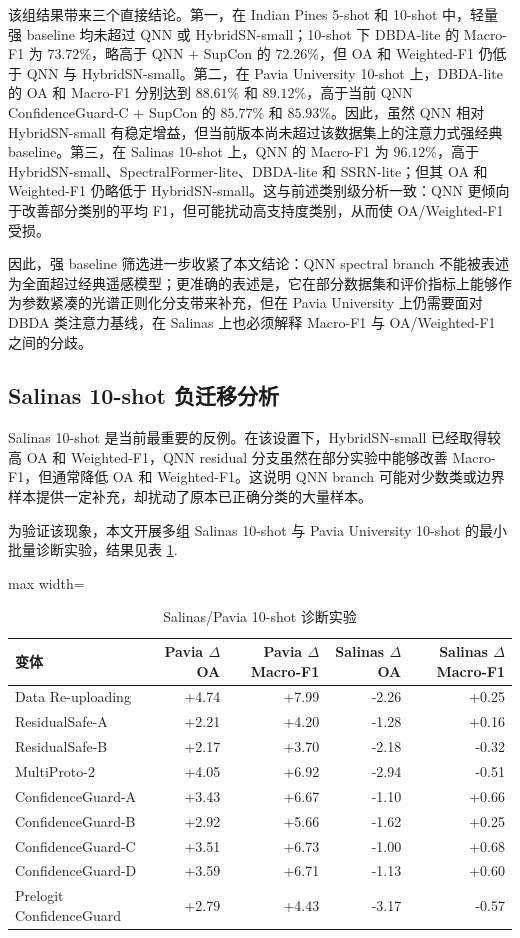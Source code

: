 \documentclass[UTF8,a4paper,zihao=-4,fontset=fandol]{ctexart}
\begin{document}
该组结果带来三个直接结论。第一，在 Indian Pines 5-shot 和 10-shot 中，轻量强 baseline 均未超过 QNN 或 HybridSN-small；10-shot 下 DBDA-lite 的 Macro-F1 为 $73.72\%$，略高于 QNN + SupCon 的 $72.26\%$，但 OA 和 Weighted-F1 仍低于 QNN 与 HybridSN-small。第二，在 Pavia University 10-shot 上，DBDA-lite 的 OA 和 Macro-F1 分别达到 $88.61\%$ 和 $89.12\%$，高于当前 QNN ConfidenceGuard-C + SupCon 的 $85.77\%$ 和 $85.93\%$。因此，虽然 QNN 相对 HybridSN-small 有稳定增益，但当前版本尚未超过该数据集上的注意力式强经典 baseline。第三，在 Salinas 10-shot 上，QNN 的 Macro-F1 为 $96.12\%$，高于 HybridSN-small、SpectralFormer-lite、DBDA-lite 和 SSRN-lite；但其 OA 和 Weighted-F1 仍略低于 HybridSN-small。这与前述类别级分析一致：QNN 更倾向于改善部分类别的平均 F1，但可能扰动高支持度类别，从而使 OA/Weighted-F1 受损。

因此，强 baseline 筛选进一步收紧了本文结论：QNN spectral branch 不能被表述为全面超过经典遥感模型；更准确的表述是，它在部分数据集和评价指标上能够作为参数紧凑的光谱正则化分支带来补充，但在 Pavia University 上仍需要面对 DBDA 类注意力基线，在 Salinas 上也必须解释 Macro-F1 与 OA/Weighted-F1 之间的分歧。

\subsection{Salinas 10-shot 负迁移分析}

Salinas 10-shot 是当前最重要的反例。在该设置下，HybridSN-small 已经取得较高 OA 和 Weighted-F1，QNN residual 分支虽然在部分实验中能够改善 Macro-F1，但通常降低 OA 和 Weighted-F1。这说明 QNN branch 可能对少数类或边界样本提供一定补充，却扰动了原本已正确分类的大量样本。

为验证该现象，本文开展多组 Salinas 10-shot 与 Pavia University 10-shot 的最小批量诊断实验，结果见表 \ref{tab:diagnostic}.

\begin{table}[htbp]
\centering
\caption{Salinas/Pavia 10-shot 诊断实验}
\label{tab:diagnostic}
\begin{adjustbox}{max width=\textwidth}
\begin{tabular}{lrrrr}
\toprule
变体 & Pavia $\Delta$OA & Pavia $\Delta$Macro-F1 & Salinas $\Delta$OA & Salinas $\Delta$Macro-F1 \\
\midrule
Data Re-uploading & +4.74 & +7.99 & -2.26 & +0.25 \\
ResidualSafe-A & +2.21 & +4.20 & -1.28 & +0.16 \\
ResidualSafe-B & +2.17 & +3.70 & -2.18 & -0.32 \\
MultiProto-2 & +4.05 & +6.92 & -2.94 & -0.51 \\
ConfidenceGuard-A & +3.43 & +6.67 & -1.10 & +0.66 \\
ConfidenceGuard-B & +2.92 & +5.66 & -1.62 & +0.25 \\
ConfidenceGuard-C & +3.51 & +6.73 & -1.00 & +0.68 \\
ConfidenceGuard-D & +3.59 & +6.71 & -1.13 & +0.60 \\
Prelogit ConfidenceGuard & +2.79 & +4.43 & -3.17 & -0.57 \\
\bottomrule
\end{tabular}
\end{adjustbox}
\end{table}
\end{document}
